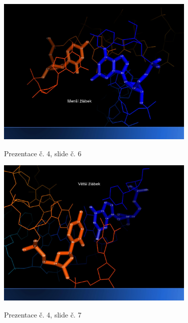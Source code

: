 \documentclass[DIV=8]{scrreprt}
\begin{document}
\begin{figure}
    \caption{Prezentace č. 4, slide č. 6}
    \includegraphics[width=0.85\textwidth]{slides-4/slide-6.jpg}
    \centering
    \label{slides-4-slide-6}
\end{figure}
\begin{figure}
    \caption{Prezentace č. 4, slide č. 7}
    \includegraphics[width=0.85\textwidth]{slides-4/slide-7.jpg}
    \centering
    \label{slides-4-slide-7}
\end{figure}
\end{document}
